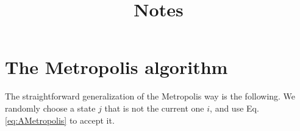 \documentclass[12pt]{article}
\begin{document}
\title{Notes}
\author{ \vspace{-10ex} }
\date{ \vspace{-10ex} }
\maketitle




\section{\label{sec:Metropolis}
The Metropolis algorithm}


The straightforward generalization of the Metropolis way is the following.
We randomly choose a state $j$ that is not the current one $i$,
and use Eq. \eqref{eq:AMetropolis} to accept it.
\end{document}
